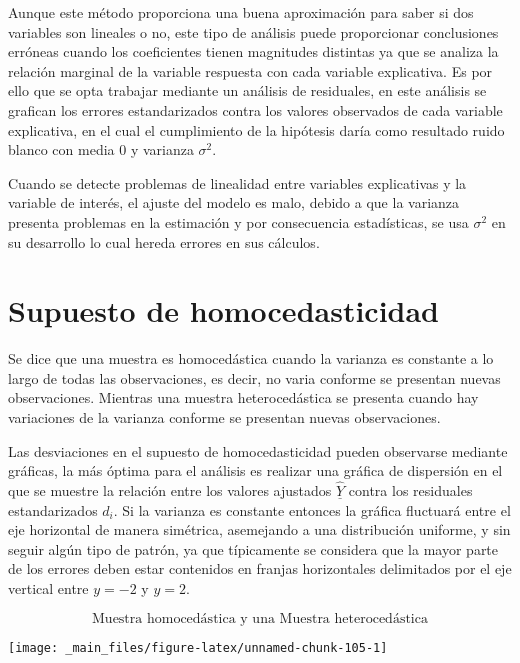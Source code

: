 \documentclass[
  a4paper,
  oneside,
  openany]{book}
\begin{document}
Aunque este método proporciona una buena aproximación para saber si dos variables son lineales o no, este tipo de análisis puede proporcionar conclusiones erróneas cuando los coeficientes tienen magnitudes distintas ya que se analiza la relación marginal de la variable respuesta con cada variable explicativa. Es por ello que se opta trabajar mediante un análisis de residuales, en este análisis se grafican los errores estandarizados contra los valores observados de cada variable explicativa, en el cual el cumplimiento de la hipótesis daría como resultado ruido blanco con media 0 y varianza \(\sigma^2.\)

Cuando se detecte problemas de linealidad entre variables explicativas y la variable de interés, el ajuste del modelo es malo, debido a que la varianza presenta problemas en la estimación y por consecuencia estadísticas, se usa \(\sigma^2\) en su desarrollo lo cual hereda errores en sus cálculos.

\hypertarget{supuesto-de-homocedasticidad}{%
\section{Supuesto de homocedasticidad}\label{supuesto-de-homocedasticidad}}

Se dice que una muestra es homocedástica cuando la varianza es constante a lo largo de todas las observaciones, es decir, no varia conforme se presentan nuevas observaciones. Mientras una muestra heterocedástica se presenta cuando hay variaciones de la varianza conforme se presentan nuevas observaciones.

Las desviaciones en el supuesto de homocedasticidad pueden observarse mediante gráficas, la más óptima para el análisis es realizar una gráfica de dispersión en el que se muestre la relación entre los valores ajustados \(\underline{\hat{Y}}\) contra los residuales estandarizados \(d_{i}\). Si la varianza es constante entonces la gráfica fluctuará entre el eje horizontal de manera simétrica, asemejando a una distribución uniforme, y sin seguir algún tipo de patrón, ya que típicamente se considera que la mayor parte de los errores deben estar contenidos en franjas horizontales delimitados por el eje vertical entre \(y=-2\) y \(y=2\).

\[\mbox{Muestra homocedástica y una Muestra heterocedástica}\]

\begin{center}\texttt{[image: \_main\_files/figure-latex/unnamed-chunk-105-1]} \end{center}
\end{document}

